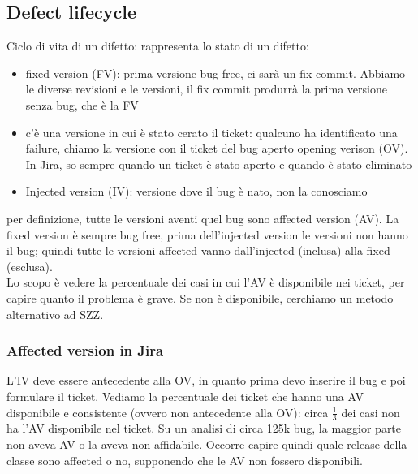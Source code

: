 \documentclass{article}
\begin{document}
\subsection{Defect lifecycle}
Ciclo di vita di un difetto: rappresenta lo stato di un difetto:
\begin{itemize}
\item fixed version (FV): prima versione bug free, ci sarà un fix commit. Abbiamo le diverse revisioni e le versioni, il fix commit produrrà la prima versione senza bug, che è la FV
\item c'è una versione in cui è stato cerato il ticket: qualcuno ha identificato una failure, chiamo la versione con il ticket del bug aperto opening verison (OV). In Jira, so sempre quando un ticket è stato aperto e quando è stato eliminato
\item Injected version (IV): versione dove il bug è nato, non la conosciamo
\end{itemize}
per definizione, tutte le versioni aventi quel bug sono affected version (AV). La fixed version è sempre bug free, prima dell'injected version le versioni non hanno il bug; quindi tutte le versioni affected vanno dall'injceted (inclusa) alla fixed (esclusa).\\ Lo scopo è vedere la percentuale dei casi in cui l'AV è disponibile nei ticket, per capire quanto il problema è grave. Se non è disponibile, cerchiamo un metodo alternativo ad SZZ.
\subsubsection{Affected version in Jira}
L'IV deve essere antecedente alla OV, in quanto prima devo inserire il bug e poi formulare il ticket. Vediamo la percentuale dei ticket che hanno una AV disponibile e consistente (ovvero non antecedente alla OV): circa $\frac{1}{3}$ dei casi non ha l'AV disponibile nel ticket. Su un analisi di circa 125k bug, la maggior parte non aveva AV o la aveva non affidabile. Occorre capire quindi quale release della classe sono affected o no, supponendo che le AV non fossero disponibili.
\end{document}
